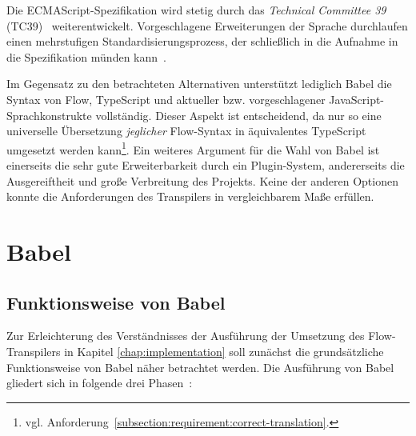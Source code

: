 

Die ECMAScript-Spezifikation wird stetig durch das \textit{Technical Committee 39} (TC39)~\autocite{TC39_COMMITTEE} weiterentwickelt. Vorgeschlagene Erweiterungen der Sprache durchlaufen einen mehrstufigen Standardisierungsprozess, der schließlich in die Aufnahme in die Spezifikation münden kann~\autocite{TC39_PROCESS}.

Im Gegensatz zu den betrachteten Alternativen unterstützt lediglich Babel die Syntax von Flow, TypeScript und aktueller bzw. vorgeschlagener JavaScript-Sprachkonstrukte vollständig. Dieser Aspekt ist entscheidend, da nur so eine universelle Übersetzung \emph{jeglicher} Flow-Syntax in äquivalentes TypeScript umgesetzt werden kann\footnote{vgl. Anforderung~\ref{subsection:requirement:correct-translation}.}.
Ein weiteres Argument für die Wahl von Babel ist einerseits die sehr gute Erweiterbarkeit durch ein Plugin-System, andererseits die Ausgereiftheit und große Verbreitung des Projekts. Keine der anderen Optionen konnte die Anforderungen des Transpilers in vergleichbarem Maße erfüllen.

\section{Babel}
\label{sec:babel}

\subsection{Funktionsweise von Babel}

Zur Erleichterung des Verständnisses der Ausführung der Umsetzung des Flow-Transpilers in Kapitel \ref{chap:implementation} soll zunächst die grundsätzliche Funktionsweise von Babel näher betrachtet werden. Die Ausführung von Babel gliedert sich in folgende drei Phasen~\autocite{BABEL:HANDBOOK}:

